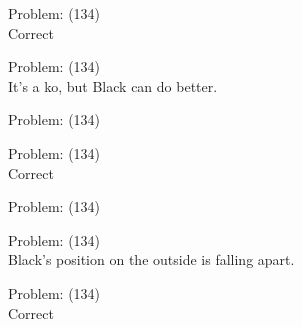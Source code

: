 \documentclass[11pt]{article}
\begin{document}
\begin{minipage}[t]{0.5\textwidth}
  {\centering
  
  Problem: (134)\\
  Correct\\
  }
\end{minipage}
\begin{minipage}[t]{0.5\textwidth}
  {\centering
  
  Problem: (134)\\
  It's a ko, but Black can do better.\\
  }
\end{minipage}
\begin{minipage}[t]{0.5\textwidth}
  {\centering
  
  Problem: (134)\\
  
  }
\end{minipage}
\begin{minipage}[t]{0.5\textwidth}
  {\centering
  
  Problem: (134)\\
  Correct\\
  }
\end{minipage}
\begin{minipage}[t]{0.5\textwidth}
  {\centering
  
  Problem: (134)\\
  
  }
\end{minipage}
\begin{minipage}[t]{0.5\textwidth}
  {\centering
  
  Problem: (134)\\
  Black's position on the outside is falling apart.\\
  }
\end{minipage}
\begin{minipage}[t]{0.5\textwidth}
  {\centering
  
  Problem: (134)\\
  Correct\\
  }
\end{minipage}
\end{document}
